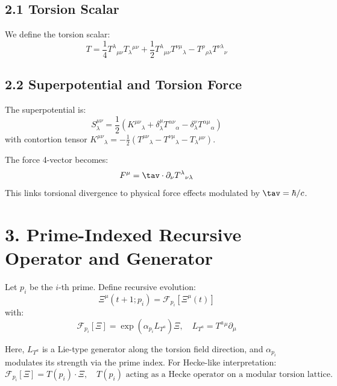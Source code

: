 \documentclass[12pt]{article}
\begin{document}
\subsection*{2.1 Torsion Scalar}
We define the torsion scalar:
\begin{equation}
    T = \frac{1}{4} T^\lambda{}_{\mu\nu} T_\lambda{}^{\mu\nu} + \frac{1}{2} T^\lambda{}_{\mu\nu} T^{\nu\mu}{}_{\lambda} - T^\rho{}_{\rho\lambda} T^{\nu\lambda}{}_{\nu}
\end{equation}

\subsection*{2.2 Superpotential and Torsion Force}
The superpotential is:
\begin{equation}
    S_\lambda^{\mu\nu} = \frac{1}{2} \left( K^{\mu\nu}{}_{\lambda} + \delta^\mu_\lambda T^{\alpha\nu}{}_{\alpha} - \delta^\nu_\lambda T^{\alpha\mu}{}_{\alpha} \right)
\end{equation}
with contortion tensor $K^{\mu\nu}{}_{\lambda} = -\frac{1}{2}(T^{\mu\nu}{}_{\lambda} - T^{\nu\mu}{}_{\lambda} - T_\lambda{}^{\mu\nu})$.

The force 4-vector becomes:
\begin{equation}
    F^\mu = \tav \cdot \partial_\nu T^\lambda{}_{\nu\lambda}
\end{equation}
This links torsional divergence to physical force effects modulated by $\tav = \hbar / c$.

\section*{3. Prime-Indexed Recursive Operator and Generator}

Let $p_i$ be the $i$-th prime. Define recursive evolution:
\begin{equation}
    \Xi^\mu(t+1; p_i) = \mathcal{F}_{p_i}[\Xi^\mu(t)]
\end{equation}
with:
\begin{equation}
    \mathcal{F}_{p_i}[\Xi] = \exp\left(\alpha_{p_i} L_{T^a} \right) \Xi, \quad L_{T^a} = T^a{}^\mu \partial_\mu
\end{equation}

Here, $L_{T^a}$ is a Lie-type generator along the torsion field direction, and $\alpha_{p_i}$ modulates its strength via the prime index. For Hecke-like interpretation:
\begin{equation}
    \mathcal{F}_{p_i}[\Xi] = T(p_i) \cdot \Xi, \quad T(p_i) \text{ acting as a Hecke operator on a modular torsion lattice.}
\end{equation}
\end{document}
